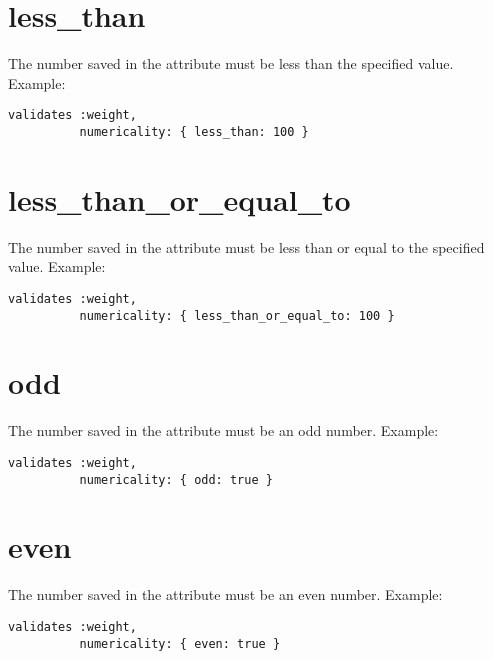 \documentclass[a4paper]{book}
\begin{document}
\section{less\_than}\label{lessux5fthan}

The number saved in the attribute must be less than the specified value. Example:

\begin{shaded}\begin{verbatim}
validates :weight,
          numericality: { less_than: 100 }
\end{verbatim}\end{shaded}

\section{less\_than\_or\_equal\_to}\label{lessux5fthanux5forux5fequalux5fto}

The number saved in the attribute must be less than or equal to the specified value. Example:

\begin{shaded}\begin{verbatim}
validates :weight,
          numericality: { less_than_or_equal_to: 100 }
\end{verbatim}\end{shaded}

\section{odd}\label{odd}

The number saved in the attribute must be an odd number. Example:

\begin{shaded}\begin{verbatim}
validates :weight,
          numericality: { odd: true }
\end{verbatim}\end{shaded}

\section{even}\label{even}

The number saved in the attribute must be an even number. Example:

\begin{shaded}\begin{verbatim}
validates :weight,
          numericality: { even: true }
\end{verbatim}\end{shaded}
\end{document}
